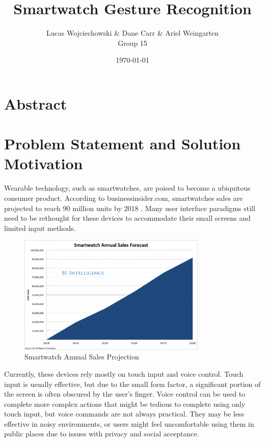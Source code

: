 \documentclass{report}
\title{Smartwatch Gesture Recognition}
\date{\today}
\author{
  Lucas Wojciechowski \& Dane Carr \& Ariel Weingarten \\
  Group 15
}
\begin{document}
\maketitle


\chapter{Abstract}


\chapter{Problem Statement and Solution Motivation}
Wearable technology, such as smartwatches, are poised to become a ubiquitous consumer product. According to businessinsider.com, smartwatches sales are projected to reach 90 million units by 2018 \cite{BusinessInsider}. Many user interface paradigms still need to be rethought for these devices to accommodate their small screens and limited input methods. 

\begin{figure}[ht!]
  \label{smartwatch}
  \centering
  \includegraphics[width=90mm]{smartwatch.png}
  \caption{Smartwatch Annual Sales Projection \label{overflow}}
\end{figure}

Currently, these devices rely mostly on touch input and voice control. Touch input is usually effective, but due to the small form factor, a significant portion of the screen is often obscured by the user's finger. Voice control can be used to complete more complex actions that might be tedious to complete using only touch input, but voice commands are not always practical. They may be less effective in noisy environments, or users might feel uncomfortable using them in public places due to issues with privacy and social acceptance.
\end{document}
